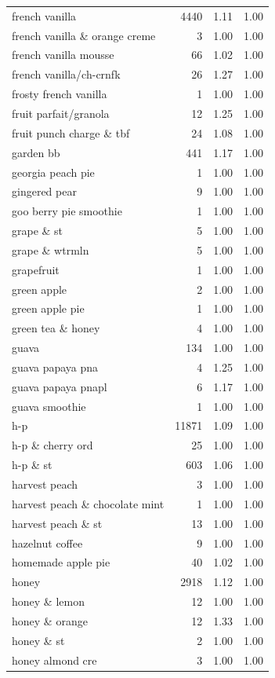 \begin{table}
\begin{tabular}{lrrr}
french vanilla & 4440 & 1.11 & 1.00 \\
french vanilla \& orange creme & 3 & 1.00 & 1.00 \\
french vanilla mousse & 66 & 1.02 & 1.00 \\
french vanilla/ch-crnfk & 26 & 1.27 & 1.00 \\
frosty french vanilla & 1 & 1.00 & 1.00 \\
fruit parfait/granola & 12 & 1.25 & 1.00 \\
fruit punch charge \& tbf & 24 & 1.08 & 1.00 \\
garden bb & 441 & 1.17 & 1.00 \\
georgia peach pie & 1 & 1.00 & 1.00 \\
gingered pear & 9 & 1.00 & 1.00 \\
goo berry pie smoothie & 1 & 1.00 & 1.00 \\
grape \& st & 5 & 1.00 & 1.00 \\
grape \& wtrmln & 5 & 1.00 & 1.00 \\
grapefruit & 1 & 1.00 & 1.00 \\
green apple & 2 & 1.00 & 1.00 \\
green apple pie & 1 & 1.00 & 1.00 \\
green tea \& honey & 4 & 1.00 & 1.00 \\
guava & 134 & 1.00 & 1.00 \\
guava papaya pna & 4 & 1.25 & 1.00 \\
guava papaya pnapl & 6 & 1.17 & 1.00 \\
guava smoothie & 1 & 1.00 & 1.00 \\
h-p & 11871 & 1.09 & 1.00 \\
h-p \& cherry ord & 25 & 1.00 & 1.00 \\
h-p \& st & 603 & 1.06 & 1.00 \\
harvest peach & 3 & 1.00 & 1.00 \\
harvest peach \& chocolate mint & 1 & 1.00 & 1.00 \\
harvest peach \& st & 13 & 1.00 & 1.00 \\
hazelnut coffee & 9 & 1.00 & 1.00 \\
homemade apple pie & 40 & 1.02 & 1.00 \\
honey & 2918 & 1.12 & 1.00 \\
honey \& lemon & 12 & 1.00 & 1.00 \\
honey \& orange & 12 & 1.33 & 1.00 \\
honey \& st & 2 & 1.00 & 1.00 \\
honey almond cre & 3 & 1.00 & 1.00 \\

\end{tabular}
\end{table}

